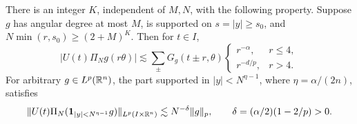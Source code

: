 \begin{lemma}\label{lem:angular-envelope}
There is an integer $K$, independent of $M,N$, with the following property.
Suppose $g$ has angular degree at most $M$, is supported on $s=|y|\ge s_0$,
and $N\min(r,s_0)\ge (2+M)^K$. Then for $t\in I$,
\begin{equation}\label{eq:ang-envelope-final}
 |U(t)\Pi_N g(r\theta)|\lesssim
 \sum_{\pm}G_g(t\pm r,\theta)
 \begin{cases} r^{-\alpha},&r\le4,\\r^{-d/p},&r>4.\end{cases}
\end{equation}
For arbitrary $g\in L^p(\mathbb R^n)$, the part supported in $|y|<N^{\eta-1}$, where
$\eta=\alpha/(2n)$, satisfies
\begin{equation}\label{eq:ang-small-source}
 \|U(t)\Pi_N(\mathbf1_{|y|<N^{\eta-1}}g)\|_{L^p(I\times\mathbb R^n)}
 \lesssim N^{-\delta}\|g\|_p,\qquad
 \delta=(\alpha/2)(1-2/p)>0 .
\end{equation}
\end{lemma}

